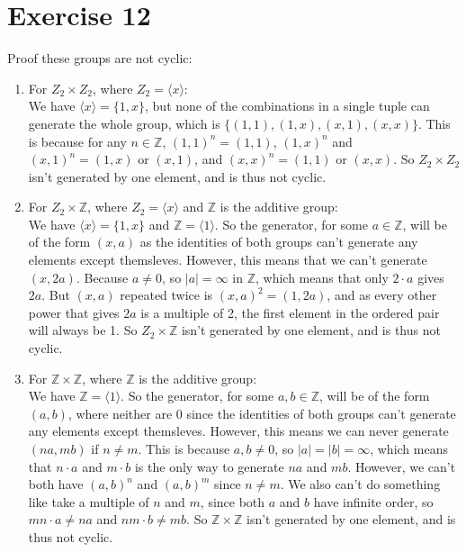 \documentclass{article}
\newcommand{\Z}{\mathbb{Z}}
\begin{document}
    \section*{Exercise 12}
    Proof these groups are not cyclic: 
    \begin{enumerate}[label=\textbf{\alph*.}]
        \item 
            For $Z_2 \times Z_2$,
            where $Z_2 = \langle x \rangle$: \\
            We have $\langle x \rangle = \{1, x\}$,
            but none of the combinations in a single tuple
            can generate the whole group,
            which is $\{(1, 1), (1, x), (x, 1), (x, x)\}$.
            This is because for any $n \in \Z$,
            $(1, 1)^n = (1, 1)$,
            $(1, x)^n$ and $(x, 1)^n = (1, x)$ or $(x, 1)$,
            and $(x, x)^n = (1, 1)$ or $(x, x)$.
            So $Z_2 \times Z_2$ isn't generated by one element,
            and is thus not cyclic.
        \item
            For $Z_2 \times \Z$,
            where $Z_2 = \langle x \rangle$
            and $\Z$ is the additive group: \\
            We have $\langle x \rangle = \{1, x\}$
            and $\Z = \langle 1 \rangle$.
            So the generator, for some $a \in \Z$,
            will be of the form $(x, a)$
            as the identities of both groups can't generate
            any elements except themsleves.
            However, this means that we can't generate $(x, 2a)$.
            Because $a \neq 0$, so $|a| = \infty$ in $\Z$,
            which means that only $2 \cdot a$ gives $2a$.
            But $(x, a)$ repeated twice is $(x, a)^2 = (1, 2a)$,
            and as every other power that gives $2a$ is a multiple of 2,
            the first element in the ordered pair will always be 1. 
            So $Z_2 \times \Z$ isn't generated by one element,
            and is thus not cyclic.
        \item
            For $\Z \times \Z$,
            where $\Z$ is the additive group: \\
            We have $\Z = \langle 1 \rangle$.
            So the generator, for some $a, b \in \Z$,
            will be of the form $(a, b)$,
            where neither are 0 
            since the identities of both groups can't generate any elements
            except themsleves.
            However, this means we can never generate $(na, mb)$
            if $n \neq m$.
            This is because $a, b \neq 0$,
            so $|a| = |b| = \infty$,
            which means that $n \cdot a$ and $m \cdot b$ is the only
            way to generate $na$ and $mb$.
            However, we can't both have $(a, b)^n$ and $(a, b)^m$
            since $n \neq m$.
            We also can't do something like take a multiple of $n$ and $m$,
            since both $a$ and $b$ have infinite order,
            so $mn \cdot a \neq na$ and $nm \cdot b \neq mb$.
            So $\Z \times \Z$ isn't generated by one element,
            and is thus not cyclic.
    \end{enumerate}
\end{document}
